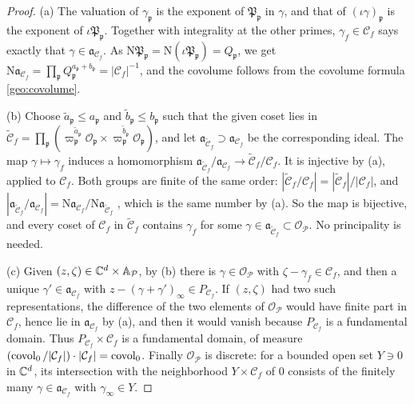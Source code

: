 \begin{proof}
(a) The valuation of $\gamma_{\mathfrak p}$ is the exponent of
$\mathfrak P_{\mathfrak p}$ in $\gamma$, and that of $(\iota\gamma)_{\mathfrak
p}$ is the exponent of $\iota\mathfrak P_{\mathfrak p}$. Together with
integrality at the other primes, $\gamma_f\in\mathcal C_f$ says exactly
that $\gamma\in\mathfrak a_{\mathcal C_f}$. As $\mathrm N\mathfrak P_{\mathfrak
p}=\mathrm N(\iota\mathfrak P_{\mathfrak p})=Q_{\mathfrak p}$, we get
$\mathrm N\mathfrak a_{\mathcal C_f}=\prod_{\mathfrak p}Q_{\mathfrak p}^{a_{\mathfrak
p}+b_{\mathfrak p}}=|\mathcal C_f|^{-1}$, and the covolume follows from
the covolume formula \eqref{geo:covolume}.

(b) Choose $\tilde a_{\mathfrak p}\le a_{\mathfrak p}$ and $\tilde
b_{\mathfrak p}\le b_{\mathfrak p}$ such that the given coset lies in
$\tilde{\mathcal C}_f=\prod_{\mathfrak p}(\varpi_{\mathfrak p}^{\tilde
a_{\mathfrak p}}\mathcal O_{\mathfrak p}\times\varpi_{\mathfrak
p}^{\tilde b_{\mathfrak p}}\mathcal O_{\mathfrak p})$, and let
$\mathfrak a_{\tilde{\mathcal C}_f}\supset\mathfrak a_{\mathcal C_f}$ be the corresponding ideal. The
map $\gamma\mapsto\gamma_f$ induces a homomorphism $\mathfrak a_{\tilde{\mathcal C}_f}/\mathfrak a_{\mathcal C_f}\to\tilde{\mathcal C}_f/\mathcal C_f$. It is injective by
(a), applied to $\mathcal C_f$. Both groups are finite of the same
order: $|\tilde{\mathcal C}_f/\mathcal C_f|=|\tilde{\mathcal
C}_f|/|\mathcal C_f|$, and $|\mathfrak a_{\tilde{\mathcal C}_f}/\mathfrak a_{\mathcal C_f}|=\mathrm N\mathfrak a_{\mathcal C_f}/\mathrm N\mathfrak a_{\tilde{\mathcal C}_f}$ \cite[Proposition~4.2]{MilneANT}, which is the
same number by (a). So the map is bijective, and every coset of
$\mathcal C_f$ in $\tilde{\mathcal C}_f$ contains $\gamma_f$ for some
$\gamma\in\mathfrak a_{\tilde{\mathcal C}_f}\subset\mathcal O_{\mathcal P}$. No principality is needed.

(c) Given $(z,\zeta)\in\mathbb C^d\times\mathbb A_{\mathcal P}$, by (b) there is
$\gamma\in\mathcal O_{\mathcal P}$ with $\zeta-\gamma_f\in\mathcal C_f$, and then a unique
$\gamma'\in\mathfrak a_{\mathcal C_f}$ with $z-(\gamma+\gamma')_\infty\in P_{\mathcal C_f}$. If $(z,\zeta)$ had two such representations, the difference of the
two elements of $\mathcal O_{\mathcal P}$ would have finite part in $\mathcal C_f$, hence
lie in $\mathfrak a_{\mathcal C_f}$ by (a), and then it would vanish because
$P_{\mathcal C_f}$ is a fundamental domain. Thus
$P_{\mathcal C_f}\times\mathcal C_f$ is a fundamental domain, of measure
$(\operatorname{covol}_0/|\mathcal C_f|)\cdot|\mathcal C_f|=\operatorname{covol}_0$. Finally $\mathcal O_{\mathcal P}$
is discrete: for a bounded open set $Y\ni0$ in $\mathbb C^d$, its intersection
with the neighborhood $Y\times\mathcal C_f$ of $0$ consists of the
finitely many $\gamma\in\mathfrak a_{\mathcal C_f}$ with $\gamma_\infty\in Y$.


\end{proof}
